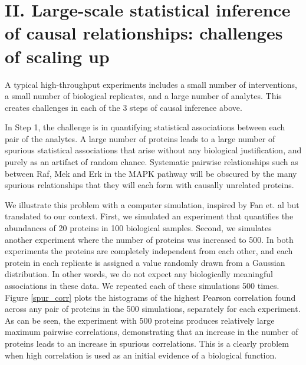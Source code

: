 \documentclass[journal=jacsat,manuscript=article]{achemso}
\begin{document}
\section{II. Large-scale statistical inference of causal relationships: challenges of scaling up}

A typical high-throughput experiments includes a small number of interventions, a small number of biological replicates, and a large number of analytes. This creates challenges in each of the 3 steps of causal inference above.

In Step 1, the challenge is in quantifying statistical associations between each pair of the analytes. A large number of proteins  leads to a large number of spurious statistical associations that arise without any biological justification, and purely as an artifact of random chance. Systematic pairwise relationships such as between Raf, Mek and Erk in the MAPK pathway will be obscured by the many spurious relationships that they will each form with causally unrelated proteins.

We illustrate this problem with a computer simulation, inspired by Fan et. al \cite{fan2014challenges} but translated to our context. First, we simulated an experiment that quantifies the abundances of 20 proteins in 100 biological samples.  Second, we simulates another experiment where the number of proteins was increased to 500.  In both experiments the proteins are completely independent from each other, and each protein in each replicate is assigned a value randomly drawn from a Gaussian distribution. In other words, we do not expect any biologically meaningful associations in these data. We repeated each of these simulations 500 times. Figure \ref{spur_corr} plots the histograms of the highest Pearson correlation found across any pair of proteins in the 500 simulations, separately for each experiment. As can be seen, the experiment with 500 proteins produces relatively large maximum pairwise correlations, demonstrating that an increase in the number of proteins leads to an increase in spurious correlations.  This is a clearly problem when high correlation is used as an initial evidence of a biological function.
\end{document}
